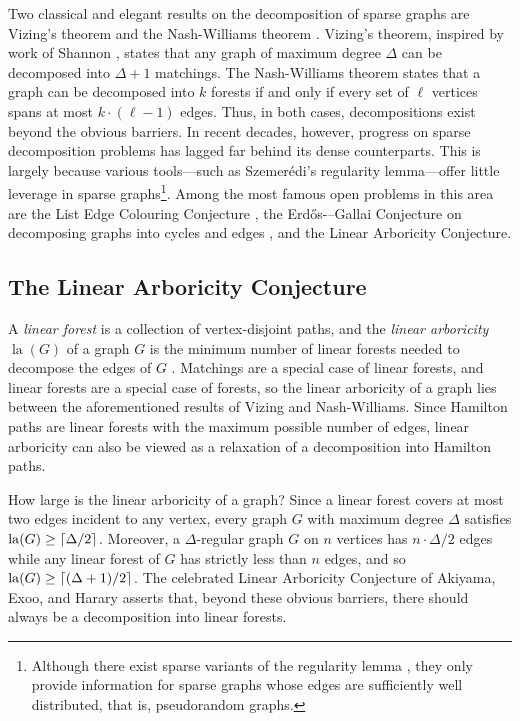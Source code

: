 \documentclass[11pt]{article}
\theoremstyle{plain}
\theoremstyle{definition}
\DeclarePairedDelimiter{\ceil}{\lceil}{\rceil}
\DeclareMathOperator{\la}{la}
\begin{document}
Two classical and elegant results on the decomposition of sparse graphs are Vizing's theorem \cite{vizing1964estimate} and the Nash-Williams theorem \cite{nash1961edge, nash1964decomposition}. Vizing's theorem, inspired by work of Shannon \cite{shannon1949theorem}, states that any graph of maximum degree $\Delta$ can be decomposed into $\Delta + 1$ matchings. The Nash-Williams theorem states that a graph can be decomposed into $k$ forests if and only if every set of $\ell$ vertices spans at most $k \cdot (\ell-1)$ edges. Thus, in both cases, decompositions exist beyond the obvious barriers. In recent decades, however, progress on sparse decomposition problems has lagged far behind its dense counterparts. This is largely because various tools---such as Szemer\'{e}di’s regularity lemma---offer little leverage in sparse graphs\footnote{Although there exist sparse variants of the regularity lemma \cite{gerke2005sparse,kohayakawa1997szemeredi, scott2011szemeredi}, they only provide information for sparse graphs whose edges are sufficiently well distributed, that is, pseudorandom graphs.}. Among the most famous open problems in this area are the List Edge Colouring Conjecture \cite{vizing1976coloring, erdos1979choosability, kahn2000asymptotics}, the Erd\H{o}s-–Gallai Conjecture on decomposing graphs into cycles and edges \cite{erdos1966representation,bucic2024towards}, and the Linear Arboricity Conjecture.

\subsection{The Linear Arboricity Conjecture}

A \emph{linear forest} is a collection of vertex-disjoint paths, and the \emph{linear arboricity} $\la(G)$ of a graph $G$  is the minimum number of linear forests needed to decompose the edges of $G$ \cite{harary1970covering}. Matchings are a special case of linear forests, and linear forests are a special case of forests, so the linear arboricity of a graph lies between the aforementioned results of Vizing and Nash-Williams. Since Hamilton paths are linear forests with the maximum possible number of edges, linear arboricity can also be viewed as a relaxation of a decomposition into Hamilton paths.

How large is the linear arboricity of a graph? Since a linear forest covers at most two edges incident to any vertex, every graph $G$ with maximum degree $\Delta$ satisfies $\la(G) \ge \ceil{\Delta/2}$. Moreover, a $\Delta$-regular graph $G$ on $n$ vertices has $n \cdot \Delta / 2$ edges while any linear forest of $G$ has strictly less than $n$ edges, and so $\la(G) \ge \ceil{(\Delta+1)/2}$. The celebrated Linear Arboricity Conjecture of Akiyama, Exoo, and Harary \cite{akiyama1980covering} asserts that, beyond these obvious barriers, there should always be a decomposition into linear forests.
\end{document}
